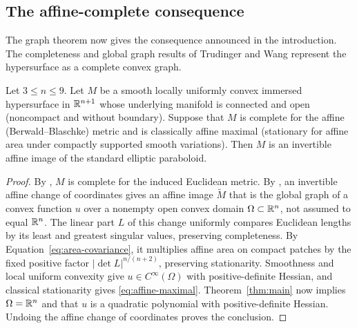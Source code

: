 \subsection*{The affine-complete consequence}

The graph theorem now gives the consequence announced in the
introduction. The completeness and global graph results of Trudinger
and Wang represent the hypersurface as a complete convex graph.

\begin{corollary}\label{cor:affine-complete}
Let \(3\le n\le9\). Let \(M\) be a smooth locally uniformly convex
immersed hypersurface in \(\mathbb R^{n+1}\) whose underlying manifold is
connected and open (noncompact and without boundary). Suppose that
\(M\) is complete for the affine (Berwald--Blaschke) metric and is
classically affine maximal (stationary for affine area under compactly
supported smooth variations). Then \(M\) is an invertible affine image
of the standard elliptic paraboloid.
\end{corollary}

\begin{proof}
By \cite[Theorem~A]{TW2002}, \(M\) is complete for the induced
Euclidean metric. By \cite[Corollary~1]{TW2002}, an invertible affine
change of coordinates gives an affine image \(\widetilde M\) that is
the global graph of a convex function \(u\) over a nonempty open convex
domain \(\Omega\subset\mathbb R^n\), not assumed to equal \(\mathbb R^n\).
The linear part \(L\) of this change uniformly compares Euclidean
lengths by its least and greatest singular values, preserving
completeness. By Equation~\eqref{eq:area-covariance}, it multiplies
affine area on compact patches by the fixed positive factor
\(|\det L|^{n/(n+2)}\), preserving stationarity.
Smoothness and local uniform convexity give
\(u\in C^\infty(\Omega)\) with positive-definite Hessian, and classical
stationarity gives \eqref{eq:affine-maximal}. Theorem~\ref{thm:main}
now implies \(\Omega=\mathbb R^n\) and that \(u\) is a quadratic polynomial
with positive-definite Hessian. Undoing the affine change of coordinates
proves the conclusion.
\end{proof}
